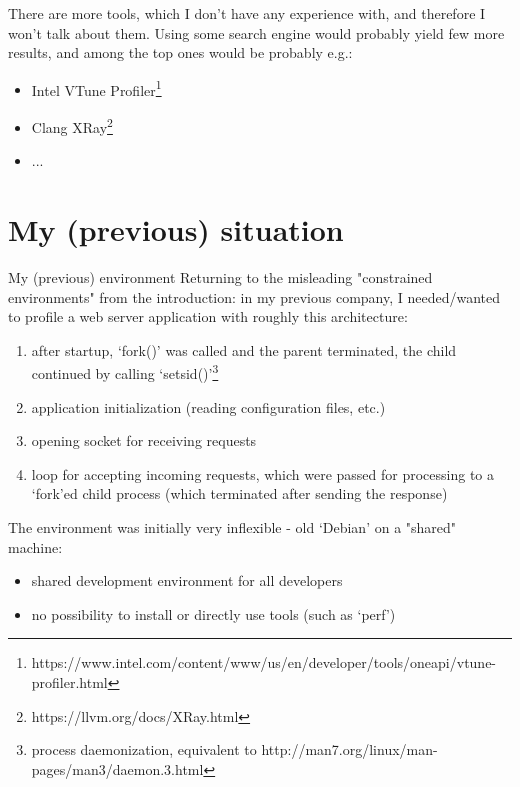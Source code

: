 \documentclass[aspectratio=169]{beamer}
\begin{document}
\begin{frame}
    There are more tools, which I don't have any experience with, and therefore I won't talk about them. Using some search engine would probably yield few more results, and among the top ones would be probably e.g.:

    \begin{itemize}
        \item Intel VTune Profiler\footnote{https://www.intel.com/content/www/us/en/developer/tools/oneapi/vtune-profiler.html}
        \item Clang XRay\footnote{https://llvm.org/docs/XRay.html}
        \item ...
    \end{itemize}

\end{frame}



\section{My (previous) situation}

\begin{frame}{My (previous) environment}
    Returning to the misleading "constrained environments" from the introduction: in my previous company, I needed/wanted to profile a web server application with roughly this architecture:

    \begin{enumerate}
        \item after startup, `fork()' was called and the parent terminated, the child continued by calling `setsid()'\footnote{process daemonization, equivalent to http://man7.org/linux/man-pages/man3/daemon.3.html}
        \item application initialization (reading configuration files, etc.)
        \item opening socket for receiving requests
        \item loop for accepting incoming requests, which were passed for processing to a `fork'ed child process (which terminated after sending the response)
    \end{enumerate}

    The environment was initially very inflexible - old `Debian' on a "shared" machine:
    
    \begin{itemize}
        \item shared development environment for all developers
        \item no possibility to install or directly use tools (such as `perf')
    \end{itemize}

\end{frame}
\end{document}
